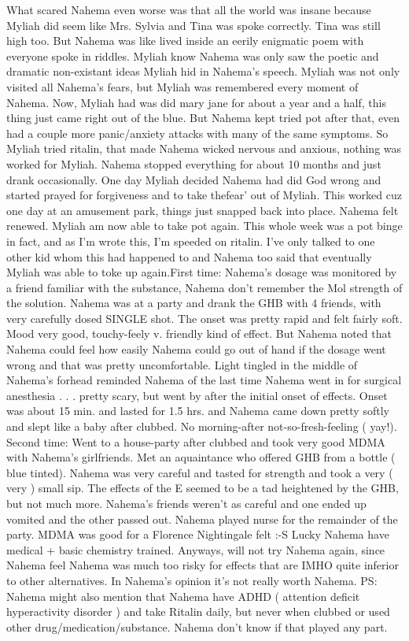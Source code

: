 \documentclass[12pt]{book}
\begin{document}
What scared Nahema even worse was that all the world was insane because Myliah did seem like Mrs. Sylvia and Tina was spoke correctly. Tina was still high too. But Nahema was like lived inside an eerily enigmatic poem with everyone spoke in riddles. Myliah know Nahema was only saw the poetic and dramatic non-existant ideas Myliah hid in Nahema's speech. Myliah was not only visited all Nahema's fears, but Myliah was remembered every moment of Nahema. Now, Myliah had was did mary jane for about a year and a half, this thing just came right out of the blue. But Nahema kept tried pot after that, even had a couple more panic/anxiety attacks with many of the same symptoms. So Myliah tried ritalin, that made Nahema wicked nervous and anxious, nothing was worked for Myliah. Nahema stopped everything for about 10 months and just drank occasionally. One day Myliah decided Nahema had did God wrong and started prayed for forgiveness and to take thefear' out of Myliah. This worked cuz one day at an amusement park, things just snapped back into place. Nahema felt renewed. Myliah am now able to take pot again. This whole week was a pot binge in fact, and as I'm wrote this, I'm speeded on ritalin. I've only talked to one other kid whom this had happened to and Nahema too said that eventually Myliah was able to toke up again.First time: Nahema's dosage was monitored by a friend familiar with the substance, Nahema don't remember the Mol strength of the solution. Nahema was at a party and drank the GHB with 4 friends, with very carefully dosed SINGLE shot. The onset was pretty rapid and felt fairly soft. Mood very good, touchy-feely v. friendly kind of effect. But Nahema noted that Nahema could feel how easily Nahema could go out of hand if the dosage went wrong and that was pretty uncomfortable. Light tingled in the middle of Nahema's forhead reminded Nahema of the last time Nahema went in for surgical anesthesia . . .  pretty scary, but went by after the initial onset of effects. Onset was about 15 min. and lasted for 1.5 hrs. and Nahema came down pretty softly and slept like a baby after clubbed. No morning-after not-so-fresh-feeling ( yay!). Second time: Went to a house-party after clubbed and took very good MDMA with Nahema's girlfriends. Met an aquaintance who offered GHB from a bottle ( blue tinted). Nahema was very careful and tasted for strength and took a very ( very ) small sip. The effects of the E seemed to be a tad heightened by the GHB, but not much more. Nahema's friends weren't as careful and one ended up vomited and the other passed out. Nahema played nurse for the remainder of the party. MDMA was good for a Florence Nightingale felt :-S Lucky Nahema have medical + basic chemistry trained. Anyways, will not try Nahema again, since Nahema feel Nahema was much too risky for effects that are IMHO quite inferior to other alternatives. In Nahema's opinion it's not really worth Nahema. PS: Nahema might also mention that Nahema have ADHD ( attention deficit hyperactivity disorder ) and take Ritalin daily, but never when clubbed or used other drug/medication/substance. Nahema don't know if that played any part.
\end{document}
